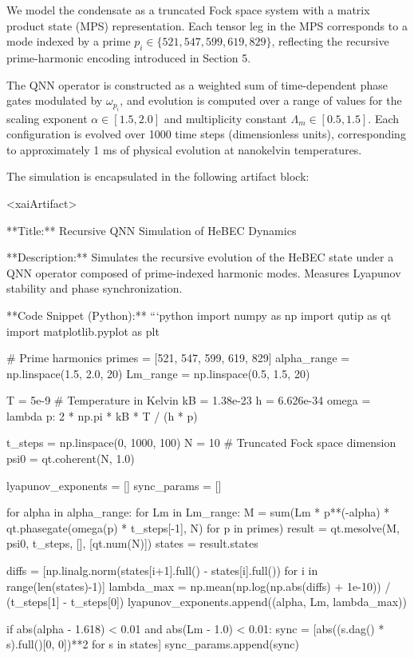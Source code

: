 \documentclass{article}
\theoremstyle{plain}
\begin{document}
We model the condensate as a truncated Fock space system with a matrix product state (MPS) representation. Each tensor leg in the MPS corresponds to a mode indexed by a prime \( p_i \in \{521, 547, 599, 619, 829\} \), reflecting the recursive prime-harmonic encoding introduced in Section 5.

The QNN operator is constructed as a weighted sum of time-dependent phase gates modulated by \(\omega_{p_i}\), and evolution is computed over a range of values for the scaling exponent \( \alpha \in [1.5, 2.0] \) and multiplicity constant \( \Lambda_m \in [0.5, 1.5] \). Each configuration is evolved over 1000 time steps (dimensionless units), corresponding to approximately 1 ms of physical evolution at nanokelvin temperatures.

The simulation is encapsulated in the following artifact block:

<xaiArtifact>

**Title:** Recursive QNN Simulation of HeBEC Dynamics

**Description:**  
Simulates the recursive evolution of the HeBEC state under a QNN operator composed of prime-indexed harmonic modes. Measures Lyapunov stability and phase synchronization.

**Code Snippet (Python):**
```python
import numpy as np
import qutip as qt
import matplotlib.pyplot as plt

# Prime harmonics
primes = [521, 547, 599, 619, 829]
alpha_range = np.linspace(1.5, 2.0, 20)
Lm_range = np.linspace(0.5, 1.5, 20)

T = 5e-9  # Temperature in Kelvin
kB = 1.38e-23
h = 6.626e-34
omega = lambda p: 2 * np.pi * kB * T / (h * p)

t_steps = np.linspace(0, 1000, 100)
N = 10  # Truncated Fock space dimension
psi0 = qt.coherent(N, 1.0)

lyapunov_exponents = []
sync_params = []

for alpha in alpha_range:
    for Lm in Lm_range:
        M = sum(Lm * p**(-alpha) * qt.phasegate(omega(p) * t_steps[-1], N) for p in primes)
        result = qt.mesolve(M, psi0, t_steps, [], [qt.num(N)])
        states = result.states

        diffs = [np.linalg.norm(states[i+1].full() - states[i].full()) for i in range(len(states)-1)]
        lambda_max = np.mean(np.log(np.abs(diffs) + 1e-10)) / (t_steps[1] - t_steps[0])
        lyapunov_exponents.append((alpha, Lm, lambda_max))

        if abs(alpha - 1.618) < 0.01 and abs(Lm - 1.0) < 0.01:
            sync = [abs((s.dag() * s).full()[0, 0])**2 for s in states]
            sync_params.append(sync)
\end{document}
